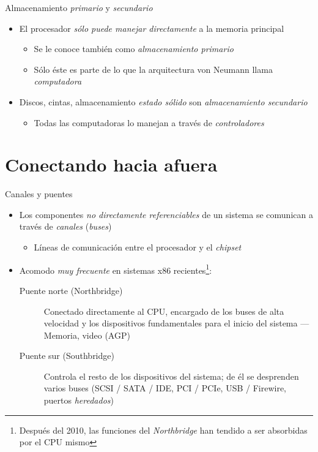 \documentclass[presentation]{beamer}
\begin{document}
\begin{frame}[label={sec:orge62f12c}]{Almacenamiento \emph{primario} y \emph{secundario}}
\begin{itemize}
\item El procesador \emph{sólo puede manejar directamente} a la memoria
principal
\begin{itemize}
\item Se le conoce también como \emph{almacenamiento primario}
\item Sólo éste es parte de lo que la arquitectura von Neumann llama
\emph{computadora}
\end{itemize}
\item Discos, cintas, almacenamiento \emph{estado sólido} son \emph{almacenamiento
secundario}
\begin{itemize}
\item Todas las computadoras lo manejan a través de \emph{controladores}
\end{itemize}
\end{itemize}
\end{frame}

\section{Conectando hacia afuera}
\label{sec:org417b513}
\begin{frame}[label={sec:org7a6af19}]{Canales y puentes}
\begin{itemize}
\item Los componentes \emph{no directamente referenciables} de un sistema se
comunican a través de \emph{canales} (\emph{buses})
\begin{itemize}
\item Líneas de comunicación entre el procesador y el \emph{chipset}
\end{itemize}
\item Acomodo \emph{muy frecuente} en sistemas x86 recientes\footnote{Después del
2010, las funciones del \emph{Northbridge} han tendido a ser absorbidas
por el CPU mismo}:
\begin{description}
\item[{Puente norte (Northbridge)}] Conectado directamente al CPU,
encargado de los buses de alta velocidad y los dispositivos
fundamentales para el inicio del sistema — Memoria, video (AGP)
\item[{Puente sur (Southbridge)}] Controla el resto de los dispositivos
del sistema; de él se desprenden varios buses (SCSI / SATA /
IDE, PCI / PCIe, USB / Firewire, puertos \emph{heredados})
\end{description}
\end{itemize}
\end{frame}
\end{document}
